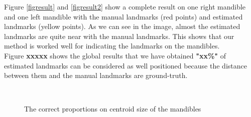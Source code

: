 \documentclass[twoside,twocolumn,10pt]{article}
\begin{document}
Figure \ref{figresult} and \ref{figresult2} show a complete result on one right mandible and one left mandible with the manual landmarks (red points) and estimated landmarks (yellow points). As we can see in the image, almost the estimated landmarks are quite near with the manual landmarks. This shows that our method is worked well for indicating the landmarks on the mandibles.\\

Figure \textbf{xxxxx} shows the global results that we have obtained \textbf{"xx\%"} of estimated landmarks can be considered as well positioned because the distance between them and the manual landmarks are ground-truth.\\
\begin{figure}[h]
\centering
{}~~
\caption{The correct proportions on centroid size of the mandibles}
\label{figctresult}
\end{figure}~\\
\end{document}
